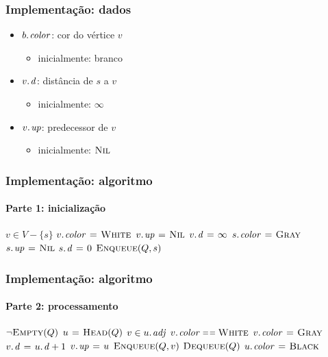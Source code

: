 \documentclass{beamer}
\begin{document}
\begin{frame}
\frametitle{Implementação: dados}

\begin{itemize}
\item $\attrib{b}{color}$: cor do vértice $v$
\begin{itemize}
\item inicialmente: branco
\end{itemize}
\item $\attrib{v}{d}$: distância de $s$ a $v$ 
\begin{itemize}
\item inicialmente: $\infty$
\end{itemize}
\item $\attrib{v}{up}$: predecessor de $v$ 
\begin{itemize}
\item inicialmente: $\textnormal{\scshape Nil}$
\end{itemize}
\end{itemize}
\end{frame}

\begin{frame}
\frametitle{Implementação: algoritmo}
\framesubtitle{Parte 1: inicialização}

\begin{codebox}
\zi {}
\zi \For $v \in V - \{ s \}$ 
\zi \Do $\attrib{v}{color} \gets \const{White}$
\zi   $\attrib{v}{up} \gets \const{Nil}$
\zi   $\attrib{v}{d} \gets \infty$
    \End
\zi $\attrib{s}{color} \gets \const{Gray}$
\zi $\attrib{s}{up} \gets \const{Nil}$
\zi $\attrib{s}{d} \gets 0$
\zi $\textnormal{\scshape Enqueue}(Q, s)$
\end{codebox}
\end{frame}

\begin{frame}
\frametitle{Implementação: algoritmo}
\framesubtitle{Parte 2: processamento}

\begin{codebox}
\zi {}
\zi \While $\neg \textnormal{\scshape Empty}(Q)$
\zi \Do $u \mathrel{\hspace{1pt}=\hspace{1pt}} \textnormal{\scshape Head}(Q)$
\zi   \For $v \in \attrib{u}{adj}$
\zi   \Do \If $\attrib{v}{color} \isequal \const{White}$
\zi     \Then $\attrib{v}{color} \gets \const{Gray}$
\zi       $\attrib{v}{d} \gets \attrib{u}{d}+1$
\zi       $\attrib{v}{up} \gets u$
\zi       $\textnormal{\scshape Enqueue}(Q, v)$
     \End
   \End
\zi   $\textnormal{\scshape Dequeue}(Q)$
\zi   $\attrib{u}{color} \gets \const{Black}$
\zi \End
\end{codebox}
\end{frame}
\end{document}
